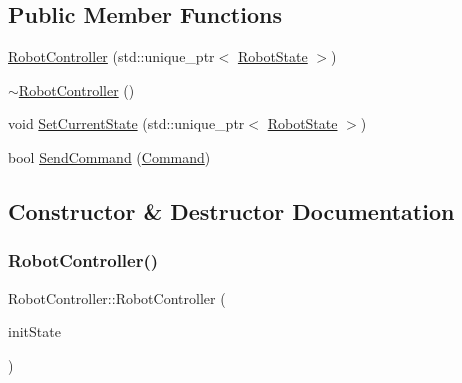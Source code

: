 \subsection*{Public Member Functions}
\begin{DoxyCompactItemize}
\item 
\mbox{\hyperlink{class_robot_controller_a2ebb7ba534ddc7e02a047b15c980f4e7}{Robot\+Controller}} (std\+::unique\+\_\+ptr$<$ \mbox{\hyperlink{class_robot_state}{Robot\+State}} $>$)
\item 
\mbox{\hyperlink{class_robot_controller_a4441cd6adf323a0ce3c454dc4f02efaf}{$\sim$\+Robot\+Controller}} ()
\item 
void \mbox{\hyperlink{class_robot_controller_a71bdb3a9c4bfa5bbdbdedcc3f0d3d8af}{Set\+Current\+State}} (std\+::unique\+\_\+ptr$<$ \mbox{\hyperlink{class_robot_state}{Robot\+State}} $>$)
\item 
bool \mbox{\hyperlink{class_robot_controller_a0eaac3943f32b7bdab6d5af94bf7af36}{Send\+Command}} (\mbox{\hyperlink{_commands_8h_a16664d91c016c57e51eff6cbd28e32cf}{Command}})
\end{DoxyCompactItemize}


\subsection{Constructor \& Destructor Documentation}
\mbox{\label{class_robot_controller_a2ebb7ba534ddc7e02a047b15c980f4e7}} 
\subsubsection{\texorpdfstring{RobotController()}{RobotController()}}
{\footnotesize\ttfamily Robot\+Controller\+::\+Robot\+Controller (\begin{DoxyParamCaption}\item[{std\+::unique\+\_\+ptr$<$ \mbox{\hyperlink{class_robot_state}{Robot\+State}} $>$}]{init\+State }\end{DoxyParamCaption})}

\mbox{\label{class_robot_controller_a4441cd6adf323a0ce3c454dc4f02efaf}} 
